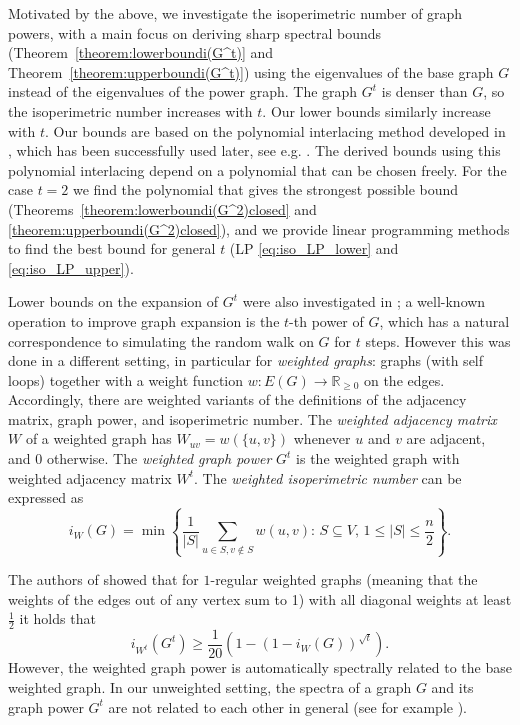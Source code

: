 \documentclass[a4paper,11pt]{article}
\theoremstyle{definition}
\def\R{\mathbb R}
\begin{document}
Motivated by the above, we investigate the isoperimetric number of graph powers, with a main focus on deriving sharp spectral bounds  (Theorem~\ref{theorem:lowerboundi(G^t)} and Theorem~\ref{theorem:upperboundi(G^t)}) using the eigenvalues of the base graph $G$ instead of the eigenvalues of the power graph. The graph $G^t$ is denser than $G$, so the isoperimetric number increases with $t$. Our lower bounds similarly increase with $t$. Our bounds are based on the polynomial interlacing method developed in \cite{acf2019}, which has been successfully used later, see e.g. \cite{AZ2025}. The derived bounds using this polynomial interlacing depend on a polynomial that can be chosen freely. For the case $t=2$ we find the polynomial that gives the strongest possible bound (Theorems~\ref{theorem:lowerboundi(G^2)closed} and \ref{theorem:upperboundi(G^2)closed}), and we provide linear programming methods to find the best bound for general $t$ (LP \eqref{eq:iso_LP_lower} and \eqref{eq:iso_LP_upper}).  
 

Lower bounds on the expansion of $G^t$ were also investigated in \cite{isoperimetricgraphpowers}; a well-known operation to improve graph expansion is the $t$-th power of $G$, which has a natural correspondence to simulating the random walk on $G$ for $t$ steps. However this was done in a different setting, in particular for \emph{weighted graphs}: graphs (with self loops) together with a weight function $w:E(G) \to \R_{\ge 0}$ on the edges. Accordingly, there are weighted variants of the definitions of the adjacency matrix, graph power, and isoperimetric number. The \emph{weighted adjacency matrix} $W$ of a weighted graph has $W_{uv}=w(\{u,v\})$ whenever $u$ and $v$ are adjacent, and 0 otherwise. The \emph{weighted graph power} $G^t$ is the weighted graph with weighted adjacency matrix $W^t$. The \emph{weighted isoperimetric number} can be expressed as $$i_W(G)= \min\left\{\frac1{|S|} \sum_{u \in S, v \notin S} w(u,v)\colon\,S \subseteq V,\,1\le |S|\le\frac n2\right\}.$$

The authors of \cite{isoperimetricgraphpowers} showed that for $1$-regular weighted graphs (meaning that the weights of the edges out of any vertex sum to 1) with all diagonal weights at least $\frac12$ it holds that
$$i_{W^t}(G^t) \ge \frac{1}{20}(1 - (1 - i_W(G))^{\sqrt{t}}).$$
However, the weighted graph power is automatically spectrally related to the base weighted graph. In our unweighted setting, the spectra of a graph $G$ and its graph power $G^t$ are not related to each other in general (see for example \cite{acfnz21,CHEN2019418,Das2013LaplacianGraph,DG2016,JZ2017}).  
\end{document}
